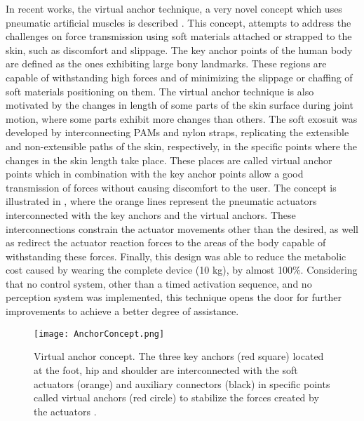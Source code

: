 In recent works, the virtual anchor technique, a very novel concept which uses pneumatic artificial muscles is described \cite{wehner2013lightweight}. This concept, attempts to address the challenges on force transmission using soft materials attached or strapped to the skin, such as discomfort and slippage. The key anchor points of the human body are defined as the ones exhibiting large bony landmarks. These regions are capable of withstanding high forces and of minimizing the slippage or chaffing of soft materials positioning on them. The virtual anchor technique is also motivated by the changes in length of some parts of the skin surface during joint motion, where some parts exhibit more changes than others. The soft exosuit was developed by interconnecting PAMs and nylon straps, replicating the extensible and non-extensible paths of the skin, respectively, in the specific points where the changes in the skin length take place. These places are called virtual anchor points which in combination with the key anchor points allow a good transmission of forces without causing discomfort to the user. The concept is illustrated in , where the orange lines represent the pneumatic actuators interconnected with the key anchors and the virtual anchors. These interconnections constrain the actuator movements other than the desired, as well as redirect the actuator reaction forces to the areas of the body capable of withstanding these forces. Finally, this design was able to reduce the metabolic cost caused by wearing the complete device (10 kg), by almost 100\%. Considering that no control system, other than a timed activation sequence, and no perception system was implemented, this technique opens the door for further improvements to achieve a better degree of assistance.

\begin{figure}[hbtp!]
    \centering
    \texttt{[image: AnchorConcept.png]}
    \caption[Virtual anchor concept. The three key anchors (red square) located at the foot, hip and shoulder are interconnected with the soft actuators (orange) and auxiliary connectors (black) in specific points called virtual anchors (red circle) to stabilize the forces created by the actuators.]{Virtual anchor concept. The three key anchors (red square) located at the foot, hip and shoulder are interconnected with the soft actuators (orange) and auxiliary connectors (black) in specific points called virtual anchors (red circle) to stabilize the forces created by the actuators \cite{wehner2013lightweight}. }
    \label{fig:anchor_concept}
\end{figure}

